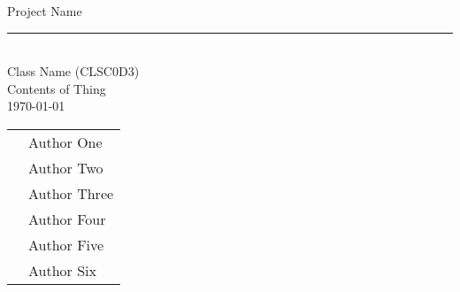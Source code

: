 \begin{titlepage}

\secfont

\begin{flushright}

\vspace*{2in}

\fontsize{40pt}{15pt}\selectfont Project Name

\noindent\rule{\textwidth}{1pt} \\ [.2in]

\fontsize{23pt}{10pt}\selectfont Class Name (CLSC0D3) \\ [.1in]
\fontsize{18pt}{20pt}\selectfont Contents of Thing \\ \today

\vspace*{\fill}

\fontsize{15pt}{16pt}\secfont\selectfont

\begin{tabularx}{\textwidth}{X|l}
&Author One \\
&Author Two \\
&Author Three \\
&Author Four \\
&Author Five \\
&Author Six
\end{tabularx}

\end{flushright}

\end{titlepage}